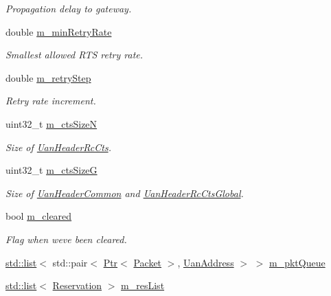 \begin{DoxyCompactItemize}
\begin{DoxyCompactList}\small\item\em Propagation delay to gateway. \end{DoxyCompactList}\item 
double \hyperlink{classns3_1_1UanMacRc_a52a16612a3223b250f3e2f8a0941eb6f}{m\+\_\+min\+Retry\+Rate}
\begin{DoxyCompactList}\small\item\em Smallest allowed R\+TS retry rate. \end{DoxyCompactList}\item 
double \hyperlink{classns3_1_1UanMacRc_a5fceb8ff276883dca8e0060035af3a60}{m\+\_\+retry\+Step}
\begin{DoxyCompactList}\small\item\em Retry rate increment. \end{DoxyCompactList}\item 
uint32\+\_\+t \hyperlink{classns3_1_1UanMacRc_a65eed8331ecf955702294cdbf47897d8}{m\+\_\+cts\+SizeN}
\begin{DoxyCompactList}\small\item\em Size of \hyperlink{classns3_1_1UanHeaderRcCts}{Uan\+Header\+Rc\+Cts}. \end{DoxyCompactList}\item 
uint32\+\_\+t \hyperlink{classns3_1_1UanMacRc_a96148aed86bf6b4ddf7b09e0bd3d478a}{m\+\_\+cts\+SizeG}
\begin{DoxyCompactList}\small\item\em Size of \hyperlink{classns3_1_1UanHeaderCommon}{Uan\+Header\+Common} and \hyperlink{classns3_1_1UanHeaderRcCtsGlobal}{Uan\+Header\+Rc\+Cts\+Global}. \end{DoxyCompactList}\item 
bool \hyperlink{classns3_1_1UanMacRc_ad55b6c8cb49de788deeae8429bded858}{m\+\_\+cleared}
\begin{DoxyCompactList}\small\item\em Flag when we\textquotesingle{}ve been cleared. \end{DoxyCompactList}\item 
\hyperlink{openflow-interface_8h_afd9bcfa176617760671b67580f536fa7}{std\+::list}$<$ std\+::pair$<$ \hyperlink{classns3_1_1Ptr}{Ptr}$<$ \hyperlink{classns3_1_1Packet}{Packet} $>$, \hyperlink{classns3_1_1UanAddress}{Uan\+Address} $>$ $>$ \hyperlink{classns3_1_1UanMacRc_ae1b75933c06f5f791dfba9065658adfd}{m\+\_\+pkt\+Queue}
\item 
\hyperlink{openflow-interface_8h_afd9bcfa176617760671b67580f536fa7}{std\+::list}$<$ \hyperlink{classns3_1_1Reservation}{Reservation} $>$ \hyperlink{classns3_1_1UanMacRc_ab1c6828d66f3809cd023b279c6c661a1}{m\+\_\+res\+List}

\end{DoxyCompactItemize}
